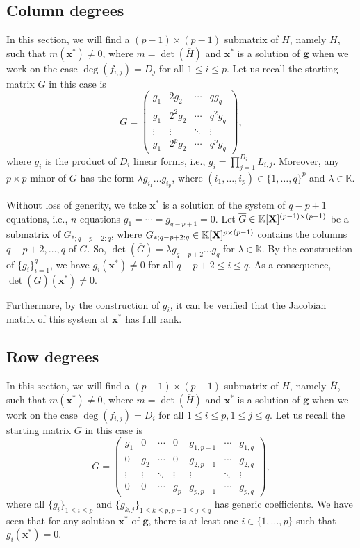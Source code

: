 \documentclass[11pt]{article}
\numberwithin{Property}{section}
\numberwithin{Theorem}{section}
\numberwithin{Proposition}{section}
\numberwithin{Lemma}{section}
\numberwithin{Corollary}{section}
\numberwithin{Definition}{section}
\numberwithin{Remark}{section}
\numberwithin{Conjecture}{section}
\numberwithin{Problem}{section}
\numberwithin{Claim}{section}
\theoremstyle{definition}
\numberwithin{Example}{section}
\def\g {\ensuremath{\mathbf{g}}}
\renewcommand{\leq}{\leqslant}
\def\bar{\overline}
\newcommand{\field}{\mathbb{K}} %
\newcommand{\mat}[1]{\mathbf{\MakeUppercase{#1}}} %
\begin{document}
\subsection{Column degrees}
\label{subsec:cd2}
In this section, we will find a $(p-1)\times (p-1)$ submatrix of $H$, namely $\bar{H}$, such that $m(\mathbf{x}^*) \ne 0$, where $m = \det(\bar{H})$ and $\mathbf{x}^*$ is a solution of $\g$ when we work on the case $\deg(f_{i,j}) = D_j$ for all $1 \leq i \leq p$. Let us recall the starting matrix $G$ in this case is 
\[G = 
\left( \begin{matrix}
g_1 & 2g_2 & \cdots & qg_{q}\\
g_1 & 2^2g_2 & \cdots & q^2g_q\\
\vdots & \vdots & \ddots & \vdots \\
g_1 & 2^pg_2 & \cdots & q^pg_q
\end{matrix} \right),
\]
where $g_{i}$ is the product of $D_i$ linear forms, i.e., $g_i = \prod_{j = 1}^{D_i}L_{i,j}$. Moreover, any $p \times p$ minor of $G$ has the form $\lambda g_{i_1}\ldots g_{i_p}$, where $(i_1, \ldots, i_p) \in \{1, \ldots,q\}^{p}$ and $\lambda \in \field$.

Without loss of generity, we take $\mathbf{x}^*$ is a solution of the system of $q-p+1$ equations, i.e., $n$ equations $g_1 = \cdots = g_{q-p+1} = 0$. Let $\bar{G} \in \field[\mat{X}]^{(p-1) \times (p-1)}$ be a submatrix of $G_{*;q-p+2:q}$, where $G_{*;q-p+2:q} \in \field[\mat{X}]^{p \times (p-1)}$ contains the columns $q-p+2, \ldots, q$ of $G$. So, $\det(\bar{G}) = \lambda g_{q-p+2}\ldots g_{q}$ for $\lambda \in \field$. By the construction of $\{g_i\}_{i=1}^{q}$, we have $g_i(\mathbf{x}^*) \ne 0$ for all $q-p+2 \leq i \leq q$. As a consequence, $\det(\bar{G})(\mathbf{x}^*) \ne 0$. 

Furthermore, by the construction of $g_{i}$, it can be verified that the Jacobian matrix of this system at $\mathbf{x}^*$ has full rank.
\subsection{Row degrees}
\label{subsec:row2}
In this section, we will find a $(p-1)\times (p-1)$ submatrix of $H$, namely $\bar{H}$, such that $m(\mathbf{x}^*) \ne 0$, where $m = \det(\bar{H})$ and $\mathbf{x}^*$ is a solution of $\g$ when we work on the case $\deg(f_{i,j}) = D_i$ for all $1 \leq i \leq p, 1\leq j \leq q$. Let us recall the starting matrix $G$ in this case is 
\[ G = \left( \begin{matrix}
g_1 & 0 & \cdots & 0 & g_{1,p+1} & \cdots & g_{1, q}\\
0 & g_2 & \cdots & 0 & g_{2,p+1} & \cdots & g_{2, q}\\
\vdots & \vdots & \ddots & \vdots & \vdots & \ddots & \vdots\\
0 & 0 & \cdots & g_p & g_{p,p+1} & \cdots & g_{p, q}
\end{matrix} \right), \] where all $\{g_i\}_{1 \leq i \leq p}$ and $\{g_{k,j}\}_{1 \leq k \leq p, p+1\leq j \leq q}$ has generic coefficients. We have seen that for any solution $\mathbf{x}^{*}$ of $\g$, there is at least one $i \in \{1, \ldots , p\}$ such that $g_i(\mathbf{x}^*) = 0$. 
\end{document}

